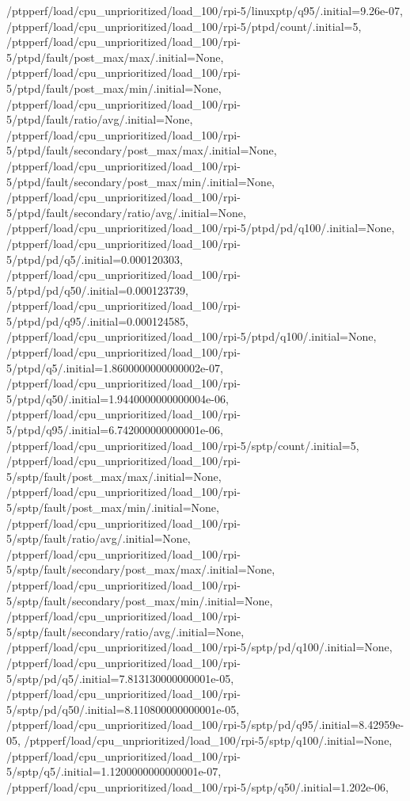 {    /ptpperf/load/cpu_unprioritized/load_100/rpi-5/linuxptp/q95/.initial=9.26e-07,
    /ptpperf/load/cpu_unprioritized/load_100/rpi-5/ptpd/count/.initial=5,
    /ptpperf/load/cpu_unprioritized/load_100/rpi-5/ptpd/fault/post_max/max/.initial=None,
    /ptpperf/load/cpu_unprioritized/load_100/rpi-5/ptpd/fault/post_max/min/.initial=None,
    /ptpperf/load/cpu_unprioritized/load_100/rpi-5/ptpd/fault/ratio/avg/.initial=None,
    /ptpperf/load/cpu_unprioritized/load_100/rpi-5/ptpd/fault/secondary/post_max/max/.initial=None,
    /ptpperf/load/cpu_unprioritized/load_100/rpi-5/ptpd/fault/secondary/post_max/min/.initial=None,
    /ptpperf/load/cpu_unprioritized/load_100/rpi-5/ptpd/fault/secondary/ratio/avg/.initial=None,
    /ptpperf/load/cpu_unprioritized/load_100/rpi-5/ptpd/pd/q100/.initial=None,
    /ptpperf/load/cpu_unprioritized/load_100/rpi-5/ptpd/pd/q5/.initial=0.000120303,
    /ptpperf/load/cpu_unprioritized/load_100/rpi-5/ptpd/pd/q50/.initial=0.000123739,
    /ptpperf/load/cpu_unprioritized/load_100/rpi-5/ptpd/pd/q95/.initial=0.000124585,
    /ptpperf/load/cpu_unprioritized/load_100/rpi-5/ptpd/q100/.initial=None,
    /ptpperf/load/cpu_unprioritized/load_100/rpi-5/ptpd/q5/.initial=1.8600000000000002e-07,
    /ptpperf/load/cpu_unprioritized/load_100/rpi-5/ptpd/q50/.initial=1.9440000000000004e-06,
    /ptpperf/load/cpu_unprioritized/load_100/rpi-5/ptpd/q95/.initial=6.742000000000001e-06,
    /ptpperf/load/cpu_unprioritized/load_100/rpi-5/sptp/count/.initial=5,
    /ptpperf/load/cpu_unprioritized/load_100/rpi-5/sptp/fault/post_max/max/.initial=None,
    /ptpperf/load/cpu_unprioritized/load_100/rpi-5/sptp/fault/post_max/min/.initial=None,
    /ptpperf/load/cpu_unprioritized/load_100/rpi-5/sptp/fault/ratio/avg/.initial=None,
    /ptpperf/load/cpu_unprioritized/load_100/rpi-5/sptp/fault/secondary/post_max/max/.initial=None,
    /ptpperf/load/cpu_unprioritized/load_100/rpi-5/sptp/fault/secondary/post_max/min/.initial=None,
    /ptpperf/load/cpu_unprioritized/load_100/rpi-5/sptp/fault/secondary/ratio/avg/.initial=None,
    /ptpperf/load/cpu_unprioritized/load_100/rpi-5/sptp/pd/q100/.initial=None,
    /ptpperf/load/cpu_unprioritized/load_100/rpi-5/sptp/pd/q5/.initial=7.813130000000001e-05,
    /ptpperf/load/cpu_unprioritized/load_100/rpi-5/sptp/pd/q50/.initial=8.110800000000001e-05,
    /ptpperf/load/cpu_unprioritized/load_100/rpi-5/sptp/pd/q95/.initial=8.42959e-05,
    /ptpperf/load/cpu_unprioritized/load_100/rpi-5/sptp/q100/.initial=None,
    /ptpperf/load/cpu_unprioritized/load_100/rpi-5/sptp/q5/.initial=1.1200000000000001e-07,
    /ptpperf/load/cpu_unprioritized/load_100/rpi-5/sptp/q50/.initial=1.202e-06,
}
